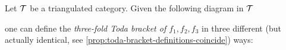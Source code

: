 Let \( {\mathcal{T}} \) be a triangulated category. Given the following diagram in \( {\mathcal{T}} \)
\begin{center}
\end{center}
one can define the \emph{three-fold Toda bracket of \( f_1, f_2, f_3 \)} in three different (but actually identical, see \autoref{prop:toda-bracket-definitions-coincide}) ways:

